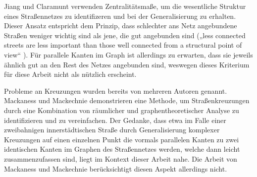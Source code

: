 \documentclass[../main/thesis.tex]{subfiles}
\begin{document}
Jiang und Claramunt verwenden Zentralitätsmaße, um die wesentliche Struktur eines Straßennetzes zu identifizeren und bei der Generalisierung zu erhalten.
Dieser Ansatz entspricht dem Prinzip, dass schlechter ans Netz angebundene Straßen weniger wichtig sind als jene, die gut angebunden sind („less connected streets are less important than those well connected from a structural point of view“ ). 
Für parallele Kanten im Graph ist allerdings zu erwarten, dass sie jeweils ähnlich gut an den Rest des Netzes angebunden sind, weswegen dieses Kriterium für diese Arbeit nicht als nützlich erscheint.


Probleme an Kreuzungen wurden bereits von mehreren Autoren genannt.
Mackaness und Mackechnie demonstrieren eine Methode, um Straßenkreuzungen durch eine Kombination von räumlicher und graphentheoretischer Analyse zu identifizieren und zu vereinfachen. 
Der Gedanke, dass etwa im Falle einer zweibahnigen innerstädtischen Straße durch Generalisierung komplexer Kreuzungen auf einen einzelnen Punkt die vormals parallelen Kanten zu zwei identischen Kanten im Graphen des Straßennetzes werden, welche dann leicht zusammenzufassen sind, liegt im Kontext dieser Arbeit nahe.
Die Arbeit von Mackaness und Mackechnie berücksichtigt diesen Aspekt allerdings nicht.







\onlyinsubfile{\listoffigures} %
\onlyinsubfile{}
\end{document}
